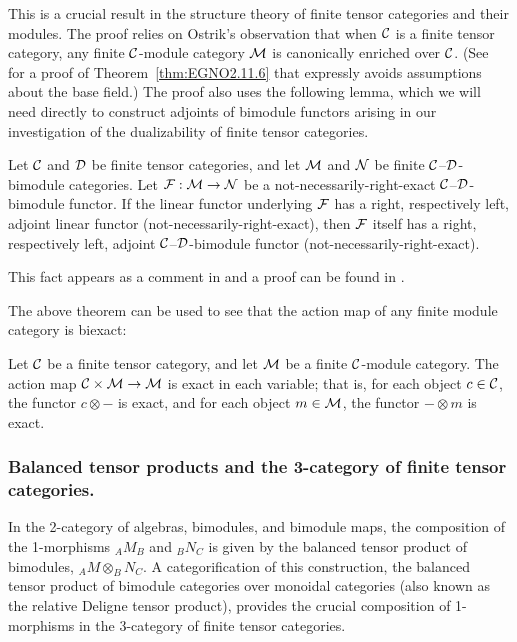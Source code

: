 \documentclass{amsart}
\begin{document}
\nid This is a crucial result in the structure theory of finite tensor categories and their modules.  The proof relies on Ostrik's observation \cite{MR1976459, EO-ftc} that when $\mathcal C$ is a finite tensor category, any finite $\mathcal C$-module category $\mathcal M$ is canonically enriched over $\mathcal C$.  (See~\cite{BTP} for a proof of Theorem~\ref{thm:EGNO2.11.6} that expressly avoids assumptions about the base field.)  The proof also uses the following lemma, which we will need directly to construct adjoints of bimodule functors arising in our investigation of the dualizability of finite tensor categories.

\begin{lemma} \label{lma:module-adjoint}
Let $\mathcal C$ and $\mathcal D$ be finite tensor categories, and let $\mathcal M$ and $\mathcal N$ be finite $\mathcal C$--$\mathcal D$-bimodule categories.  Let $\mathcal F: \mathcal M \to \mathcal N$ be a not-necessarily-right-exact $\mathcal C$--$\mathcal D$-bimodule functor.  If the linear functor underlying $\mathcal F$ has a right, respectively left, adjoint linear functor (not-necessarily-right-exact), then $\mathcal F$ itself has a right, respectively left, adjoint $\mathcal C$--$\mathcal D$-bimodule functor (not-necessarily-right-exact).
\end{lemma}

\nid This fact appears as a comment in \cite{EO-ftc} and a proof can be found in \cite{BTP}.  

The above theorem can be used to see that the action map of any finite module category is biexact:
\begin{corollary} \label{cor:biexact_action}
Let $\mathcal C$ be a finite tensor category, and let $\mathcal M$ be a finite $\mathcal C$-module category.  The action map $\mathcal C \times \mathcal M \rightarrow \mathcal M$ is exact in each variable; that is, for each object $c \in \mathcal C$, the functor $c \otimes -$ is exact, and for each object $m \in \mathcal M$, the functor $- \otimes m$ is exact.
\end{corollary}


\subsubsection{Balanced tensor products and the 3-category of finite tensor categories.}

In the 2-category of algebras, bimodules, and bimodule maps, the composition of the 1-morphisms $_A M_B$ and $_B N_C$ is given by the balanced tensor product of bimodules, $_A M \otimes_B N_C$.  A categorification of this construction, the balanced tensor product of bimodule categories over monoidal categories (also known as the relative Deligne tensor product), provides the crucial composition of 1-morphisms in the 3-category of finite tensor categories.
\end{document}
